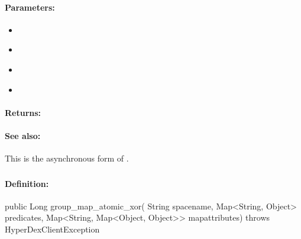 \paragraph{Parameters:}
\begin{itemize}[noitemsep]
\item {}\\

\item {}\\

\item {}\\

\item {}\\

\end{itemize}

\paragraph{Returns:}


\paragraph{See also:}  This is the asynchronous form of .

\pagebreak
\subsubsection{}
\label{api:java:group_map_atomic_xor}


\paragraph{Definition:}
\begin{javacode}
public Long group_map_atomic_xor(
        String spacename,
        Map<String, Object> predicates,
        Map<String, Map<Object, Object>> mapattributes) throws HyperDexClientException
\end{javacode}


